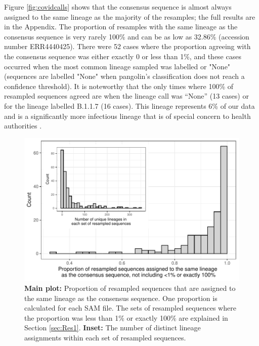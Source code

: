 \documentclass[10pt]{article}
\begin{document}
Figure \ref{fig:covidcalls} shows that the consensus sequence is almost always assigned to the same lineage as the majority of the resamples; the full results are in the Appendix.
The proportion of resamples with the same lineage as the consensus sequence is very rarely 100\% and can be as low as 32.86\% (accession number ERR4440425).
There were 52 cases where the proportion agreeing with the consensus sequence was either exactly 0 or less than 1\%, and these cases occurred when the most common lineage sampled was labelled or "None" (sequences are labelled "None" when pangolin's classification does not reach a confidence threshold).
It is noteworthy that the only times where 100\% of resampled sequences agreed are when the lineage call was ``None'' (13 cases) or for the lineage labelled B.1.1.7 (16 cases).
This lineage represents 6\% of our data and is a significantly more infectious lineage that is of special concern to health authorities \citep{Wisem4857, europeancentrefordiseasepreventionandcontrolSARSCoV2VariantsConcern2021}. 


\begin{figure}
\includegraphics[width=\textwidth]{figs/prop_correct.pdf}
\caption{\label{fig:covidcalls2}\textbf{Main {}plot:} Proportion of resampled sequences that are assigned to the same lineage as the consensus sequence.
One proportion is calculated for each SAM file.
The sets of resampled sequences where the proportion was less than 1\% or exactly 100\% are explained in Section \ref{sec:Res1}.
\textbf{Inset:} The number of distinct lineage assignments within each set of resampled sequences.}
\end{figure}
\end{document}
